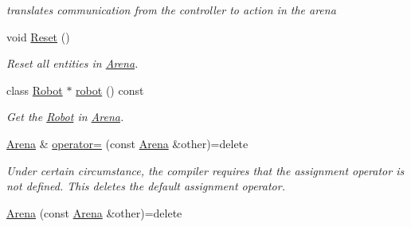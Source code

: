 \begin{DoxyCompactItemize}
\begin{DoxyCompactList}\small\item\em translates communication from the controller to action in the arena \end{DoxyCompactList}\item 
void \hyperlink{class_arena_a95e295d03a14385f4402a8e839fbae9b}{Reset} ()\hypertarget{class_arena_a95e295d03a14385f4402a8e839fbae9b}{}\label{class_arena_a95e295d03a14385f4402a8e839fbae9b}

\begin{DoxyCompactList}\small\item\em Reset all entities in \hyperlink{class_arena}{Arena}. \end{DoxyCompactList}\item 
class \hyperlink{class_robot}{Robot} $\ast$ \hyperlink{class_arena_af9b489317866a4541c6531acb63602c3}{robot} () const 
\begin{DoxyCompactList}\small\item\em Get the \hyperlink{class_robot}{Robot} in \hyperlink{class_arena}{Arena}. \end{DoxyCompactList}\item 
\hyperlink{class_arena}{Arena} \& \hyperlink{class_arena_aa977a50aa4a5570a2a553705f1909e9b}{operator=} (const \hyperlink{class_arena}{Arena} \&other)=delete\hypertarget{class_arena_aa977a50aa4a5570a2a553705f1909e9b}{}\label{class_arena_aa977a50aa4a5570a2a553705f1909e9b}

\begin{DoxyCompactList}\small\item\em Under certain circumstance, the compiler requires that the assignment operator is not defined. This {\ttfamily deletes} the default assignment operator. \end{DoxyCompactList}\item 
\hyperlink{class_arena_afce6e35e1470823539dc9194bef77499}{Arena} (const \hyperlink{class_arena}{Arena} \&other)=delete\hypertarget{class_arena_afce6e35e1470823539dc9194bef77499}{}\label{class_arena_afce6e35e1470823539dc9194bef77499}


\end{DoxyCompactItemize}

